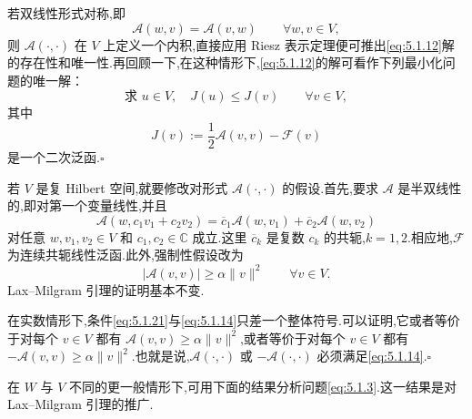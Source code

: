 \begin{note}
若双线性形式对称,即
\begin{equation}\label{eq:5.1.18}
  \mathcal A(w,v)=\mathcal A(v,w)\qquad\forall w,v\in V,
\end{equation}
则 \(\mathcal A(\cdot,\cdot)\) 在 \(V\) 上定义一个内积,直接应用 Riesz 表示定理便可推出\eqref{eq:5.1.12}解的存在性和唯一性.再回顾一下,在这种情形下,\eqref{eq:5.1.12}的解可看作下列最小化问题的唯一解：
\begin{equation}\label{eq:5.1.19}
  \text{求 }u\in V,\quad J(u)\le J(v)\qquad\forall v\in V,
\end{equation}
其中
\begin{equation}\label{eq:5.1.20}
  J(v):=\frac12\mathcal A(v,v)-\mathcal F(v)
\end{equation}
是一个二次泛函.\hfill\(\square\)
\end{note}

\begin{note}
若 \(V\) 是复 Hilbert 空间,就要修改对形式 \(\mathcal A(\cdot,\cdot)\) 的假设.首先,要求 \(\mathcal A\) 是半双线性的,即对第一个变量线性,并且
\[
  \mathcal A(w,c_1v_1+c_2v_2)
   =\overline c_1\mathcal A(w,v_1)+\overline c_2\mathcal A(w,v_2)
\]
对任意 \(w,v_1,v_2\in V\) 和 \(c_1,c_2\in\mathbb C\) 成立.这里 \(\overline c_k\) 是复数 \(c_k\) 的共轭,\(k=1,2\).相应地,\(\mathcal F\) 为连续共轭线性泛函.此外,强制性假设改为
\begin{equation}\label{eq:5.1.21}
  |\mathcal A(v,v)|\ge\alpha\|v\|^2\qquad\forall v\in V.
\end{equation}
Lax--Milgram 引理的证明基本不变.

在实数情形下,条件\eqref{eq:5.1.21}与\eqref{eq:5.1.14}只差一个整体符号.可以证明,它或者等价于对每个 \(v\in V\) 都有 \(\mathcal A(v,v)\ge\alpha\|v\|^2\),或者等价于对每个 \(v\in V\) 都有 \(-\mathcal A(v,v)\ge\alpha\|v\|^2\).也就是说,\(\mathcal A(\cdot,\cdot)\) 或 \(-\mathcal A(\cdot,\cdot)\) 必须满足\eqref{eq:5.1.14}.\hfill\(\square\)
\end{note}

在 \(W\) 与 \(V\) 不同的更一般情形下,可用下面的结果分析问题\eqref{eq:5.1.3}.这一结果是对 Lax--Milgram 引理的推广.

